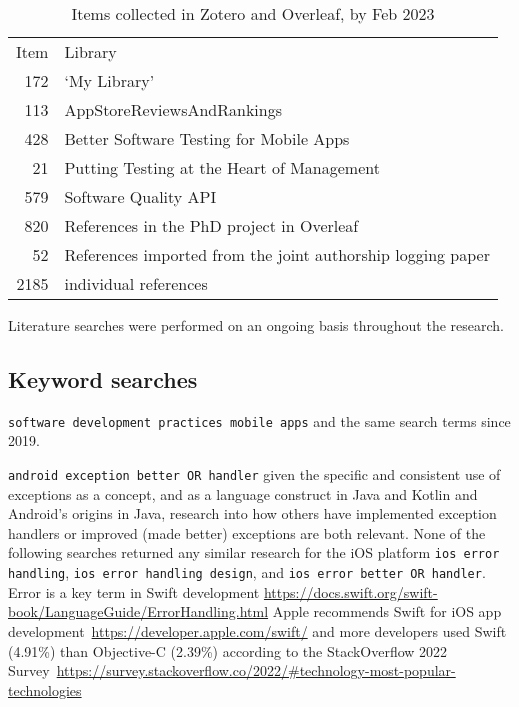 \begin{table}
    \centering
    \begin{tabular}{r|l}
       Item  &  Library \\
     172 & `My Library' \\
     113 & AppStoreReviewsAndRankings \\
     428 & Better Software Testing for Mobile Apps \\
      21 & Putting Testing at the Heart of Management \\
     579 & Software Quality API \\
     820 & References in the PhD project in Overleaf \\
      52 & References imported from the joint authorship logging paper \\
      \hline
      2185 & individual references \\
    \end{tabular}
    \caption{Items collected in Zotero and Overleaf, by  Feb 2023}
    \label{tab:zotero-libraries-counts}
\end{table}


Literature searches were performed on an ongoing basis throughout the research.

\subsection{Keyword searches}


\verb|software development practices mobile apps| and the same search terms since 2019.

\verb|android exception better OR handler| given the specific and consistent use of exceptions as a concept, and as a language construct in Java and Kotlin and Android's origins in Java, research into how others have implemented exception handlers or improved (made better) exceptions are both relevant. None of the following searches returned any similar research for the iOS platform \verb|ios error handling|, \verb|ios error handling design|, and \verb|ios error better OR handler|. Error is a key term in Swift development \url{https://docs.swift.org/swift-book/LanguageGuide/ErrorHandling.html} Apple recommends Swift for iOS app development~\url{https://developer.apple.com/swift/} and more developers used Swift (4.91\%) than Objective-C (2.39\%) according to the StackOverflow 2022 Survey~\url{https://survey.stackoverflow.co/2022/\#technology-most-popular-technologies} 

